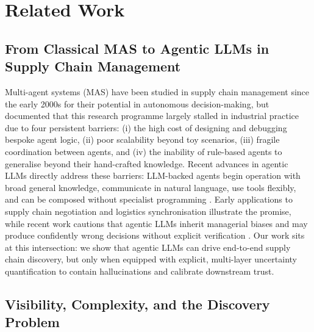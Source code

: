\documentclass{article}
\begin{document}
\section{Related Work}

\label{sec:related_work}


\subsection{From Classical MAS to Agentic LLMs in Supply Chain Management}

Multi-agent systems (MAS) have been studied in supply chain management since the early 2000s for their potential in autonomous decision-making, but \citet{xu2021bots} documented that this research programme largely stalled in industrial practice due to four persistent barriers: (i) the high cost of designing and debugging bespoke agent logic, (ii) poor scalability beyond toy scenarios, (iii) fragile coordination between agents, and (iv) the inability of rule-based agents to generalise beyond their hand-crafted knowledge. Recent advances in agentic LLMs directly address these barriers: LLM-backed agents begin operation with broad general knowledge, communicate in natural language, use tools flexibly, and can be composed without specialist programming \citep{bubeck2023sparks, li2025chatsync}. Early applications to supply chain negotiation \citep{jannelli2025agentic} and logistics synchronisation \citep{li2025chatsync} illustrate the promise, while recent work cautions that agentic LLMs inherit managerial biases \citep{chen2025manager} and may produce confidently wrong decisions without explicit verification \citep{menache2025generative}. Our work sits at this intersection: we show that agentic LLMs can drive end-to-end supply chain discovery, but only when equipped with explicit, multi-layer uncertainty quantification to contain hallucinations and calibrate downstream trust.

\subsection{Visibility, Complexity, and the Discovery Problem}
\end{document}
